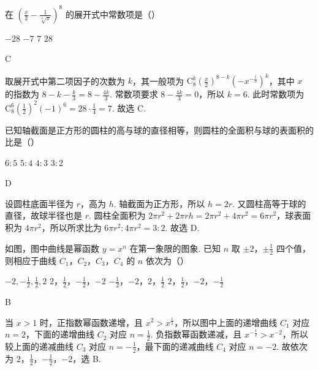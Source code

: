 \begin{problem}
在 \(\left(\frac{x}{2}-\frac{1}{\sqrt[3]{x}}\right)^8\) 的展开式中常数项是（\quad）

\choices
    {\(-28\)}
    {\(-7\)}
    {\(7\)}
    {\(28\)}

\begin{answer}
C
\end{answer}

\begin{solution}
取展开式中第二项因子的次数为 \(k\)，其一般项为 \(\mathrm C_8^k\left(\frac{x}{2}\right)^{8-k}\left(-x^{-\frac{1}{3}}\right)^k\)，其中 \(x\) 的指数为 \(8-k-\frac{k}{3}=8-\frac{4k}{3}\). 常数项要求 \(8-\frac{4k}{3}=0\)，所以 \(k=6\). 此时常数项为 \(\mathrm C_8^6\left(\frac{1}{2}\right)^2(-1)^6=28\cdot\frac{1}{4}=7\). 故选 C.
\end{solution}
\end{problem}

\begin{problem}
已知轴截面是正方形的圆柱的高与球的直径相等，则圆柱的全面积与球的表面积的比是（\quad）

\choices
    {\(6:5\)}
    {\(5:4\)}
    {\(4:3\)}
    {\(3:2\)}

\begin{answer}
D
\end{answer}

\begin{solution}
设圆柱底面半径为 \(r\)，高为 \(h\). 轴截面为正方形，所以 \(h=2r\). 又圆柱高等于球的直径，故球半径也是 \(r\). 圆柱全面积为 \(2\pi r^2+2\pi rh=2\pi r^2+4\pi r^2=6\pi r^2\)，球表面积为 \(4\pi r^2\)，所以所求比为 \(6\pi r^2:4\pi r^2=3:2\). 故选 D.
\end{solution}
\end{problem}

\begin{problem}
如图，图中曲线是幂函数 \(y=x^n\) 在第一象限的图象. 已知 \(n\) 取 \(\pm 2\)，\(\pm \frac{1}{2}\) 四个值，则相应于曲线 \(C_{1}\)，\(C_{2}\)，\(C_{3}\)，\(C_{4}\) 的 \(n\) 依次为（\quad）


\choices
    {\(-2,-\frac{1}{2},\frac{1}{2},2\)}
    {\(2\)，\(\frac{1}{2}\)，\(-\frac{1}{2}\)，\(-2\)}
    {\(-\frac{1}{2}\)，\(-2\)，\(2\)，\(\frac{1}{2}\)}
    {\(2\)，\(\frac{1}{2}\)，\(-2\)，\(-\frac{1}{2}\)}

\begin{answer}
B
\end{answer}

\begin{solution}
当 \(x>1\) 时，正指数幂函数递增，且 \(x^2>x^{\frac{1}{2}}\)，所以图中上面的递增曲线 \(C_1\) 对应 \(n=2\)，下面的递增曲线 \(C_2\) 对应 \(n=\frac{1}{2}\). 负指数幂函数递减，且 \(x^{-\frac{1}{2}}>x^{-2}\)，所以较上面的递减曲线 \(C_3\) 对应 \(n=-\frac{1}{2}\)，最下面的递减曲线 \(C_4\) 对应 \(n=-2\). 故依次为 \(2\)，\(\frac{1}{2}\)，\(-\frac{1}{2}\)，\(-2\)，选 B.
\end{solution}
\end{problem}

